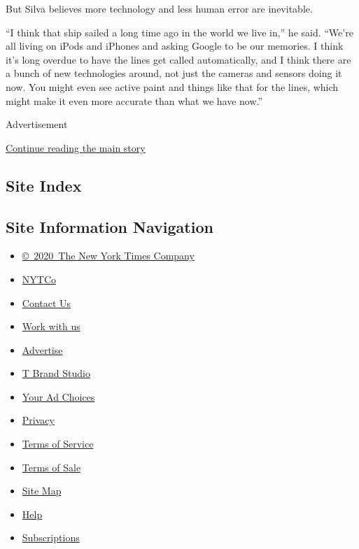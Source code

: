 But Silva believes more technology and less human error are inevitable.

``I think that ship sailed a long time ago in the world we live in,'' he
said. ``We're all living on iPods and iPhones and asking Google to be
our memories. I think it's long overdue to have the lines get called
automatically, and I think there are a bunch of new technologies around,
not just the cameras and sensors doing it now. You might even see active
paint and things like that for the lines, which might make it even more
accurate than what we have now.''

Advertisement

\protect\hyperlink{after-bottom}{Continue reading the main story}

\hypertarget{site-index}{%
\subsection{Site Index}\label{site-index}}

\hypertarget{site-information-navigation}{%
\subsection{Site Information
Navigation}\label{site-information-navigation}}

\begin{itemize}
\tightlist
\item
  \href{https://help.nytimes3xbfgragh.onion/hc/en-us/articles/115014792127-Copyright-notice}{©~2020~The
  New York Times Company}
\end{itemize}

\begin{itemize}
\tightlist
\item
  \href{https://www.nytco.com/}{NYTCo}
\item
  \href{https://help.nytimes3xbfgragh.onion/hc/en-us/articles/115015385887-Contact-Us}{Contact
  Us}
\item
  \href{https://www.nytco.com/careers/}{Work with us}
\item
  \href{https://nytmediakit.com/}{Advertise}
\item
  \href{http://www.tbrandstudio.com/}{T Brand Studio}
\item
  \href{https://www.nytimes3xbfgragh.onion/privacy/cookie-policy\#how-do-i-manage-trackers}{Your
  Ad Choices}
\item
  \href{https://www.nytimes3xbfgragh.onion/privacy}{Privacy}
\item
  \href{https://help.nytimes3xbfgragh.onion/hc/en-us/articles/115014893428-Terms-of-service}{Terms
  of Service}
\item
  \href{https://help.nytimes3xbfgragh.onion/hc/en-us/articles/115014893968-Terms-of-sale}{Terms
  of Sale}
\item
  \href{https://spiderbites.nytimes3xbfgragh.onion}{Site Map}
\item
  \href{https://help.nytimes3xbfgragh.onion/hc/en-us}{Help}
\item
  \href{https://www.nytimes3xbfgragh.onion/subscription?campaignId=37WXW}{Subscriptions}
\end{itemize}
